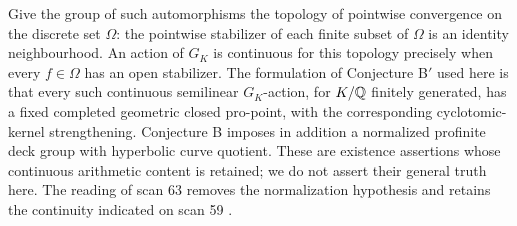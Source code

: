 Give the group of such automorphisms the topology of pointwise
convergence on the discrete set $\Omega$: the pointwise stabilizer
of each finite subset of $\Omega$ is an identity neighbourhood.
An action of $G_K$ is continuous for this topology precisely when
every $f\in\Omega$ has an open stabilizer. The formulation of
Conjecture B$'$ used here is that every such continuous semilinear
$G_K$-action, for $K/\mathbb Q$ finitely generated, has a fixed completed
geometric closed pro-point, with the corresponding
cyclotomic-kernel strengthening. Conjecture B imposes in addition
a normalized profinite deck group with hyperbolic curve quotient.
These are existence assertions whose continuous arithmetic content
is retained; we do not assert their general truth here. The reading
of scan 63 removes the normalization hypothesis and retains the
continuity indicated on scan 59 \cite[scans 59, 63]{Prompt2026}.

